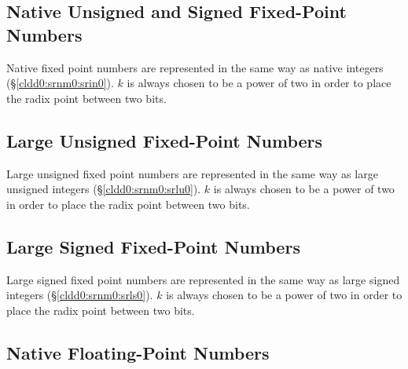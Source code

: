 \subsection{Native Unsigned and Signed Fixed-Point Numbers}
\label{cldd0:srnm0:snfp0}

Native fixed point numbers are represented in the same way as native
integers (\S{}\ref{cldd0:srnm0:srin0}).  $k$ is always chosen to be a
power of two in order to place the radix point between two bits.


\subsection{Large Unsigned Fixed-Point Numbers}
\label{cldd0:srnm0:srlu5}

Large unsigned fixed point numbers are represented in the same way as
large unsigned integers (\S{}\ref{cldd0:srnm0:srlu0}).  $k$ is always
chosen to be a power of two in order to place the radix point between two
bits.


\subsection{Large Signed Fixed-Point Numbers}
\label{cldd0:srnm0:srlu6}

Large signed fixed point numbers are represented in the same 
way as large signed integers (\S{}\ref{cldd0:srnm0:srls0}).  
$k$ is always chosen to be a power of two in order to place 
the radix point between two bits.  


\subsection{Native Floating-Point Numbers}
\label{cldd0:srnm0:sfpn0}

